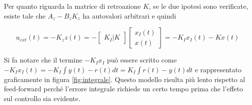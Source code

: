 		\noindent Per quanto riguarda la matrice di retroazione $K$, se le due ipotesi sono verificate, esiste tale che $A_z-B_zK_z$ ha autovalori arbitrari e quindi
		
		\begin{equation}
			u_{ext}(t)=-K_zz(t)=-
			\begin{bmatrix}
				K_I | K
			\end{bmatrix}
			\begin{bmatrix}
				x_I(t) \\
				x(t)
			\end{bmatrix}
			=-K_Ix_I(t)-Kx(t)
		\end{equation}
	
		\noindent Si fa notare che il termine $-K_Ix_I$ può essere scritto come $-K_Ix_I(t)=-K_I\int y(t)-r(t)dt=K_I\int r(t)-y(t)dt$ e rappresentato graficamente in figura \ref{fig:integrale}. 
		\newline  Questo modello risulta più lento rispetto al feed-forward perché l'errore integrale richiede un certo tempo prima che l'effeto sul controllo sia evidente.  
